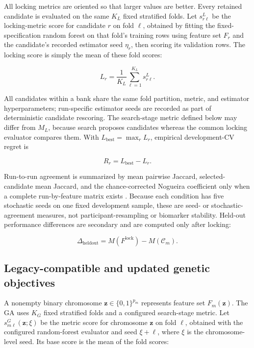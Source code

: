 All locking metrics are oriented so that larger values are better. Every retained candidate is evaluated on the same \(K_L\) fixed stratified folds. Let \(s^{L}_{r\ell}\) be the locking-metric score for candidate \(r\) on fold \(\ell\), obtained by fitting the fixed-specification random forest on that fold's training rows using feature set \(F_r\) and the candidate's recorded estimator seed \(\eta_r\), then scoring its validation rows. The locking score is simply the mean of these fold scores:

\begin{equation}
L_r=\frac{1}{K_L}\sum_{\ell=1}^{K_L}s^{L}_{r\ell}.
\label{eq:locking-score}
\end{equation}

All candidates within a bank share the same fold partition, metric, and estimator hyperparameters; run-specific estimator seeds are recorded as part of deterministic candidate rescoring. The search-stage metric defined below may differ from \(M_L\), because search proposes candidates whereas the common locking evaluator compares them. With \(L_{\mathrm{best}}=\max_rL_r\), empirical development-CV regret is

\begin{equation}
R_r=L_{\mathrm{best}}-L_r.
\label{eq:regret}
\end{equation}

Run-to-run agreement is summarized by mean pairwise Jaccard, selected-candidate mean Jaccard, and the chance-corrected Nogueira coefficient only when a complete run-by-feature matrix exists \citep{ref36}. Because each condition has five stochastic seeds on one fixed development sample, these are seed- or stochastic-agreement measures, not participant-resampling or biomarker stability. Held-out performance differences are secondary and are computed only after locking:

\begin{equation}
\Delta_{\mathrm{heldout}}=M(F^{\mathrm{lock}})-M(\mathcal C_m).
\label{eq:heldout-delta}
\end{equation}

\subsection{Legacy-compatible and updated genetic objectives}

A nonempty binary chromosome \(\mathbf z\in\{0,1\}^{p_m}\) represents feature set \(F_m(\mathbf z)\). The GA uses \(K_G\) fixed stratified folds and a configured search-stage metric. Let \(s^{G}_{m\ell}(\mathbf z;\xi)\) be the metric score for chromosome \(\mathbf z\) on fold \(\ell\), obtained with the configured random-forest evaluator and seed \(\xi+\ell\), where \(\xi\) is the chromosome-level seed. Its base score is the mean of the fold scores:

